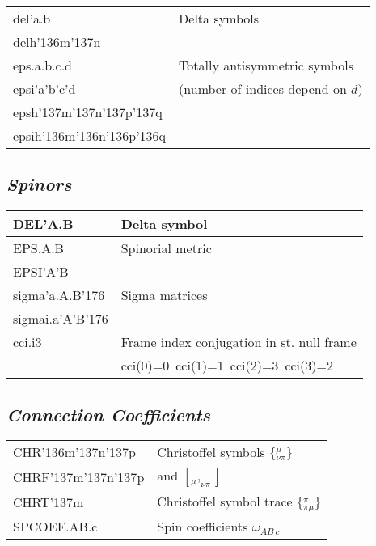 \documentclass[twocolumn]{article}
\newcommand{\grgtt}{\ttfamily}
\renewcommand{\tt}{\grgtt}
\def\^{{\tt \char'136}}                     %
\def\_{{\tt \char'137}}                     %
\newcommand{\cc}{{\tt \char'176}}           %
\begin{document}
\begin{tabular}{|l|l|}
\hline
\tt  del'a.b       &  Delta symbols   \\
\tt  delh\^m\_n    &                  \\
\hline
\tt  eps.a.b.c.d   &  Totally antisymmetric symbols \\
\tt  epsi'a'b'c'd  &  (number of indices depend on $d$)  \\
\tt  epsh\_m\_n\_p\_q  &                     \\
\tt  epsih\^m\^n\^p\^q &                     \\
\hline
\end{tabular}

\subsection{\sf\slshape Spinors}

\begin{tabular}{|l|l|}
\hline
\tt  DEL'A.B      & Delta symbol          \\
\hline
\tt  EPS.A.B      & Spinorial metric      \\
\tt  EPSI'A'B     &                       \\
\hline
\tt  sigma'a.A.B\cc   & Sigma matrices      \\
\tt  sigmai.a'A'B\cc  &                    \\
\hline
\tt  cci.i3    & Frame index conjugation in st. null frame \\
	       & {\tt cci(0)=0}\ {\tt cci(1)=1}\ {\tt cci(2)=3}\ {\tt cci(3)=2} \\
\hline
\end{tabular}

\subsection{\sf\slshape Connection Coefficients}

\begin{tabular}{|l|l|}
\hline
\tt  CHR\^m\_n\_p  &  Christoffel symbols $\{{}^\mu_{\nu\pi}\}$ \\
\tt  CHRF\_m\_n\_p &  and $[{}_{\mu},_{\nu\pi}]$  \\
\tt  CHRT\_m       &  Christoffel symbol trace $\{{}^\pi_{\pi\mu}\}$  \\
\hline
\tt  SPCOEF.AB.c     & Spin coefficients $\omega_{AB\,c}$  \\
\hline
\end{tabular}
\end{document}

